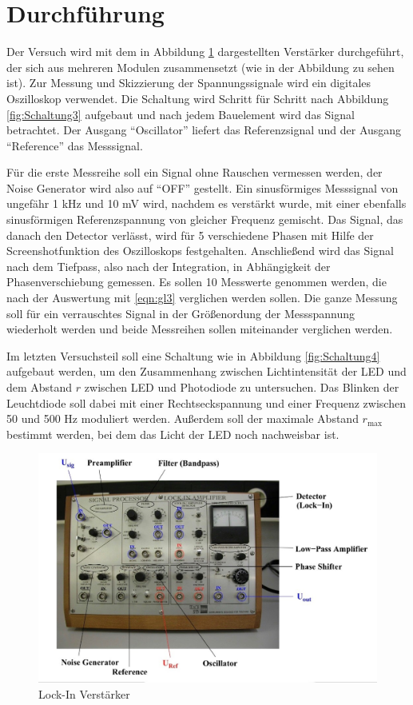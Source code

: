 \section{Durchführung}
\label{sec:Durchführung}
Der Versuch wird mit dem in Abbildung \ref{fig:Schaltung2} dargestellten Verstärker durchgeführt, der sich aus mehreren Modulen zusammensetzt (wie in der Abbildung zu sehen ist).
Zur Messung und Skizzierung der Spannungssignale wird ein digitales Oszilloskop verwendet.
Die Schaltung wird Schritt für Schritt nach Abbildung \ref{fig:Schaltung3} aufgebaut und nach jedem Bauelement wird das Signal betrachtet.
Der Ausgang \enquote{Oscillator} liefert das Referenzsignal und der Ausgang \enquote{Reference} das Messsignal.

Für die erste Messreihe soll ein Signal ohne Rauschen vermessen werden, der Noise Generator wird also auf \enquote{OFF} gestellt.
Ein sinusförmiges Messsignal von ungefähr 1 kHz und 10 mV wird, nachdem es verstärkt wurde, mit einer ebenfalls sinusförmigen Referenzspannung von gleicher Frequenz gemischt.
Das Signal, das danach den Detector verlässt, wird für 5 verschiedene Phasen mit Hilfe der Screenshotfunktion des Oszilloskops festgehalten.
Anschließend wird das Signal nach dem Tiefpass, also nach der Integration, in Abhängigkeit der Phasenverschiebung gemessen.
Es sollen 10 Messwerte genommen werden, die nach der Auswertung mit \eqref{eqn:gl3} verglichen werden sollen.
Die ganze Messung soll für ein verrauschtes Signal in der Größenordung der Messspannung wiederholt werden und beide Messreihen sollen miteinander verglichen werden.

Im letzten Versuchsteil soll eine Schaltung wie in Abbildung \ref{fig:Schaltung4} aufgebaut werden, um den Zusammenhang zwischen Lichtintensität der LED und dem Abstand $r$ zwischen LED und Photodiode zu untersuchen.
Das Blinken der Leuchtdiode soll dabei mit einer Rechtseckspannung und einer Frequenz zwischen 50 und 500 Hz moduliert werden.
Außerdem soll der maximale Abstand $r_{\text{max}}$ bestimmt werden, bei dem das Licht der LED noch nachweisbar ist.

\begin{figure}
  \centering
  \includegraphics[width=\textwidth]{data/Schaltung2.jpg}
  \caption{Lock-In Verstärker \cite{V303}}
  \label{fig:Schaltung2}
\end{figure}

